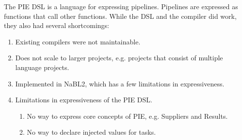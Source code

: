 The PIE DSL is a language for expressing pipelines.
Pipelines are expressed as functions that call other functions.
While the DSL and the compiler did work, they also had several shortcomings:
\begin{enumerate}
  \item Existing compilers were not maintainable.
  \item Does not scale to larger projects, e.g. projects that consist of multiple language projects.
  \item Implemented in NaBL2, which has a few limitations in expressiveness.
  \item Limitations in expressiveness of the PIE DSL.
  \begin{enumerate}
    \item No way to express core concepts of PIE, e.g. Suppliers and Results.
    \item No way to declare injected values for tasks.
  \end{enumerate}
\end{enumerate}
